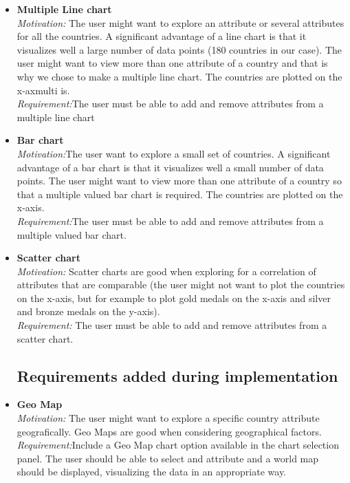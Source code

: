 \documentclass[a4paper]{article}
\begin{document}
\begin{itemize}
\item[\checkmark]{\textbf{Multiple Line chart}
\\\textit{Motivation:} The user might want to explore an attribute or several attributes for all the countries. A significant advantage of a line chart is that it visualizes well a large number of data points (180 countries in our case). The user might want to view more than one attribute of a country and that is why we chose to make a multiple line chart. The countries are plotted on the x-axmulti is.
\\\textit{Requirement:}The user must be able to add and remove attributes from a multiple line chart
}

\item[\checkmark]{\textbf{Bar chart}
\\\textit{Motivation:}The user want to explore a small set of countries. A significant advantage of a bar chart is that it visualizes well a small number of data points. The user might want to view more than one attribute of a country so that a multiple valued bar chart is required. The countries are plotted on the x-axis.
\\\textit{Requirement:}The user must be able to add and remove attributes from  a multiple valued bar chart.
}

\item[\checkmark]{\textbf{Scatter chart}
\\\textit{Motivation:} Scatter charts are good when exploring for a correlation of attributes that are comparable (the user might not want to plot the countries on the x-axis, but for example to plot gold medals on the x-axis and silver and bronze medals on the y-axis).
\\\textit{Requirement:} The user must be able to add and remove attributes from a scatter chart.
}

\subsection{Requirements added during implementation}

\item[\checkmark]{\textbf{Geo Map}
\\\textit{Motivation:} The user might want to explore a specific country attribute geografically. Geo Maps are good when considering geographical factors.
\\\textit{Requirement:}Include a Geo Map chart option available in the chart selection panel. The user should be able to select and attribute and a world map should be displayed, visualizing the data in an appropriate way.
}


\end{itemize}
\end{document}
